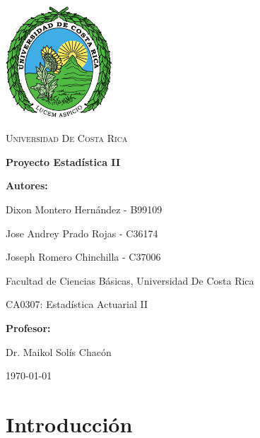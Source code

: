 \documentclass[12pt, a4paper]{article}
\begin{document}
\begin{titlepage}
    \centering

    \includegraphics[width=0.3\textwidth]{LogoUCR.png}\par\vspace{1cm}

    {\scshape\LARGE Universidad De Costa Rica \par}
    \vspace{1.5cm}

    {\Huge\bfseries Proyecto Estadística II\par}
    \vspace{1.5cm}

    {\large \bfseries Autores:\par}
    {\Large Dixon Montero Hernández - B99109 \par}
    {\Large Jose Andrey Prado Rojas - C36174 \par}
    {\Large Joseph Romero Chinchilla - C37006\par}
    \vspace{0.5cm}
    {\large Facultad de Ciencias Básicas, Universidad De Costa Rica\par}
    {\large CA0307: Estadística Actuarial II}
    \vspace{2cm}

    {\large\bfseries Profesor:\par}
    {\large Dr. Maikol Solís Chacón}

    \vfill

    {\large \today\par}
\end{titlepage}

\section*{Introducción}
\end{document}
